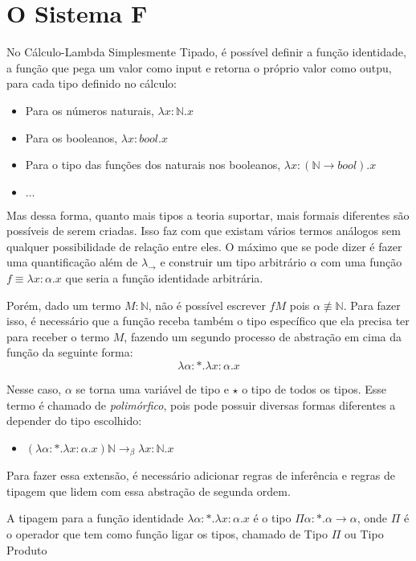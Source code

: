 \documentclass[../main.tex]{subfiles}
\begin{document}
\section{O Sistema F}

No Cálculo-Lambda Simplesmente Tipado, é possível definir a função identidade, a função que pega um valor como input e retorna o próprio valor como outpu, para cada tipo definido no cálculo:

\begin{itemize}
    \item Para os números naturais, $\lambda x : \mathbb{N} . x$
    \item Para os booleanos, $\lambda x: bool . x$
    \item Para o tipo das funções dos naturais nos booleanos, $\lambda x : (\mathbb{N} \to bool) . x$
    \item $\dots$
\end{itemize}

Mas dessa forma, quanto mais tipos a teoria suportar, mais formais diferentes são possíveis de serem criadas. Isso faz com que existam vários termos análogos sem qualquer possibilidade de relação entre eles. O máximo que se pode dizer é fazer uma quantificação além de $\lambda_{\to}$ e construir um tipo arbitrário $\alpha$ com uma função $f \equiv \lambda x : \alpha . x$ que seria a função identidade arbitrária.

Porém, dado um termo $M : \mathbb{N}$, não é possível escrever $fM$ pois $\alpha \not\equiv \mathbb{N}$. Para fazer isso, é necessário que a função receba também o tipo específico que ela precisa ter para receber o termo $M$, fazendo um segundo processo de abstração em cima da função da seguinte forma: $$\lambda \alpha : \ast . \lambda x : \alpha . x$$

Nesse caso, $\alpha$ se torna uma variável de tipo e $\star$ o tipo de todos os tipos. Esse termo é chamado de \emph{polimórfico}, pois pode possuir diversas formas diferentes a depender do tipo escolhido:

\begin{itemize}
    \item $(\lambda \alpha : \ast . \lambda x : \alpha . x)\mathbb{N} \to_{\beta} \lambda x : \mathbb{N} . x$
\end{itemize}

Para fazer essa extensão, é necessário adicionar regras de inferência e regras de tipagem que lidem com essa abstração de segunda ordem.

A tipagem para a função identidade $\lambda \alpha : \ast . \lambda x : \alpha . x$ é o tipo $\Pi \alpha : \ast . \alpha \to \alpha$, onde $\Pi$ é o operador que tem como função ligar os tipos, chamado de Tipo $\Pi$ ou Tipo Produto
\end{document}
